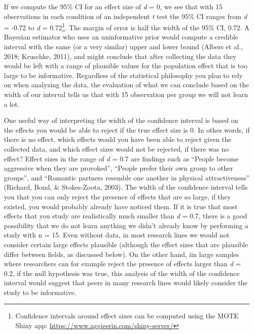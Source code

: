 \documentclass[
  english,
  ,jou, a4paper,floatsintext]{apa6}
\begin{document}
If we compute the 95\% CI for an effect size of \emph{d} = 0, we see that with 15 observations in each condition of an independent \emph{t} test the 95\% CI ranges from \emph{d} = -0.72 to \emph{d} = 0.72\footnote{Confidence intervals around effect sizes can be computed using the MOTE Shiny app: \url{https://www.aggieerin.com/shiny-server/}}. The margin of error is half the width of the 95\% CI, 0.72. A Bayesian estimator who uses an uninformative prior would compute a credible interval with the same (or a very similar) upper and lower bound (Albers et al., 2018; Kruschke, 2011), and might conclude that after collecting the data they would be left with a range of plausible values for the population effect that is too large to be informative. Regardless of the statistical philosophy you plan to rely on when analyzing the data, the evaluation of what we can conclude based on the width of our interval tells us that with 15 observation per group we will not learn a lot.

One useful way of interpreting the width of the confidence interval is based on the effects you would be able to reject if the true effect size is 0. In other words, if there is no effect, which effects would you have been able to reject given the collected data, and which effect sizes would not be rejected, if there was no effect? Effect sizes in the range of \emph{d} = 0.7 are findings such as ``People become aggressive when they are provoked'', ``People prefer their own group to other groups'', and ``Romantic partners resemble one another in physical attractiveness'' (Richard, Bond, \& Stokes-Zoota, 2003). The width of the confidence interval tells you that you can only reject the presence of effects that are so large, if they existed, you would probably already have noticed them. If it is true that most effects that you study are realistically much smaller than \emph{d} = 0.7, there is a good possibility that we do not learn anything we didn't already know by performing a study with n = 15. Even without data, in most research lines we would not consider certain large effects plausible (although the effect sizes that are plausible differ between fields, as discussed below). On the other hand, iin large samples where researchers can for example reject the presence of effects larger than \emph{d} = 0.2, if the null hypothesis was true, this analysis of the width of the confidence interval would suggest that peers in many research lines would likely consider the study to be informative.
\end{document}
